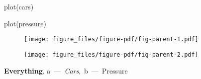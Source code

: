 \documentclass[
]{article}
\newenvironment{Shaded}{}{}
\newcommand{\FunctionTok}[1]{\textcolor[rgb]{0.02,0.16,0.49}{#1}}
\newcommand{\NormalTok}[1]{#1}
\begin{document}
\hypertarget{fig:parent}{}
\begin{Shaded}
\begin{Highlighting}[]
\FunctionTok{plot}\NormalTok{(cars)}
\end{Highlighting}
\end{Shaded}

\begin{Shaded}
\begin{Highlighting}[]
\FunctionTok{plot}\NormalTok{(pressure)}
\end{Highlighting}
\end{Shaded}

\begin{figure}
\hypertarget{fig:parent-1}{%
\centering
\texttt{[image: figure\_files/figure-pdf/fig-parent-1.pdf]}
\caption{}\label{fig:parent-1}
}
\end{figure}

\begin{figure}
\hypertarget{fig:parent-2}{%
\centering
\texttt{[image: figure\_files/figure-pdf/fig-parent-2.pdf]}
\caption{}\label{fig:parent-2}
}
\end{figure}

\textbf{Everything}. a~---~\emph{Cars},~b~---~Pressure
\end{document}
